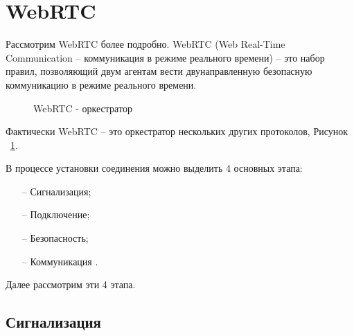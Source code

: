 \section{WebRTC}

Рассмотрим WebRTC более подробно. WebRTC (Web Real-Time Communication -- коммуникация в режиме реального времени) -- это набор правил, позволяющий двум агентам вести двунаправленную безопасную коммуникацию в режиме реального времени.

\begin{figure}[ht]
\begin{center}

\caption{
\label{webrtc-orchestrator}
     WebRTC - оркестратор}
\end {center}
\end {figure}

Фактически WebRTC -- это оркестратор нескольких других протоколов, Рисунок ~\ref{webrtc-orchestrator}.

В процессе установки соединения можно выделить 4 основных этапа:
\begin{itemize}
	\item[--] Сигнализация;
	\item[--] Подключение;
        \item[--] Безопасность;
        \item[--] Коммуникация \cite{v3}.
\end{itemize}

Далее рассмотрим эти 4 этапа.

\subsection{Сигнализация}

